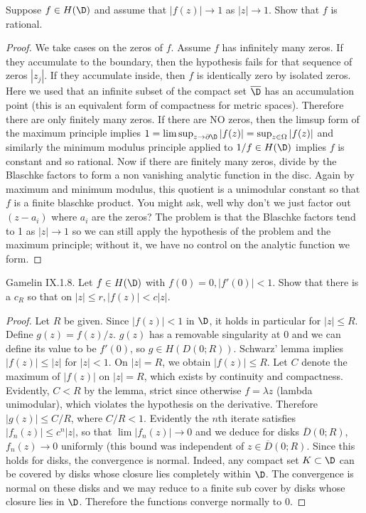 \documentclass[11pt]{book}
\theoremstyle{definition}
\begin{document}
Suppose $f\in H(\D)$ and assume that $|f(z)|\to 1$ as $|z|\to 1$. Show that $f$ is rational.
\begin{proof}
We take cases on the zeros of $f$. Assume $f$ has infinitely many zeros. If they accumulate to the boundary, then the hypothesis fails for that sequence of zeros $|z_j|$. If they accumulate inside, then $f$ is identically zero by isolated zeros. Here we used that an infinite subset of the compact set $\overline\D$ has an accumulation point (this is an equivalent form of compactness for metric spaces). Therefore there are only finitely many zeros. If there are NO zeros, then the limsup form of the maximum principle implies $1=\limsup_{z\to\partial\D} |f(z)| = \sup_{z\in\Omega}|f(z)|$ and similarly the minimum modulus principle applied to $1/f\in H(\D)$ implies $f$ is constant and so rational. Now if there are finitely many zeros, divide by the Blaschke factors to form a non vanishing analytic function in the disc. Again by maximum and minimum modulus, this quotient is a unimodular constant so that $f$ is a finite blaschke product. You might ask, well why don't we just factor out $(z-a_i)$ where $a_i$ are the zeros? The problem is that the Blaschke factors tend to 1 as $|z|\to1$ so we can still apply the hypothesis of the problem and the maximum principle; without it, we have no control on the analytic function we form.
\end{proof}
Gamelin IX.1.8. Let $f\in H(\D)$ with $f(0)=0, |f'(0)|<1$. Show that there is a $c_R$ so that on $|z|\leq r, |f(z)|<c|z|$.
\begin{proof}
Let $R$ be given. Since $|f(z)|<1$ in $\D$, it holds in particular for $|z|\leq R$. Define $g(z)=f(z)/z$. $g(z)$ has a removable singularity at 0 and we can define its value to be $f'(0)$, so $g\in H(D(0;R))$. Schwarz' lemma implies $|f(z)|\leq |z|$ for $|z|<1$. On $|z|=R$, we obtain $|f(z)|\leq R$. Let $C$ denote the maximum of $|f(z)|$ on $|z|=R$, which exists by continuity and compactness. Evidently, $C<R$ by the lemma, strict since otherwise $f=\lambda z$ (lambda unimodular), which violates the hypothesis on the derivative. Therefore $|g(z)|\leq C/R$, where $C/R<1$. Evidently the $n$th iterate satisfies $|f_n(z)|\leq c^n|z|$, so that $\lim |f_n(z)|\to 0$ and we deduce for disks $\overline{D}(0;R)$, $f_n(z)\to 0$ uniformly (this bound was independent of $z\in\overline{D}(0;R)$. Since this holds for disks, the convergence is normal. Indeed, any compact set $K\subset \D$ can be covered by disks whose closure lies completely within $\D$. The convergence is normal on these disks and we may reduce to a finite sub cover by disks whose closure lies in $\D$. Therefore the functions converge normally to 0.
\end{proof}
\end{document}
